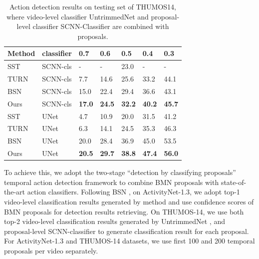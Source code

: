 \documentclass[10pt,twocolumn,letterpaper]{article}
\begin{document}
\begin{table}[tbp]
\centering
\caption{Action detection results on testing set of THUMOS14, where video-level classifier UntrimmedNet \cite{wang2017untrimmednets} and proposal-level classifier SCNN-Classifier \cite{shou2016action} are combined with proposals.}
\small
\begin{tabular}{p{1.4cm}p{1.4cm}p{0.52cm}<{\centering}p{0.52cm}<{\centering}p{0.52cm}<{\centering}p{0.52cm}<{\centering}p{0.52cm}<{\centering}}
\toprule
Method & classifier & 0.7 & 0.6 & 0.5 & 0.4 & 0.3  \\
\hline
SST \cite{sst_buch_cvpr17} & SCNN-cls 	& - & - & 23.0 & - &  -\\
TURN\cite{gao2017turn} & SCNN-cls 		& 7.7 & 14.6 & 25.6 & 33.2 &  44.1\\
BSN \cite{lin2018bsn} & SCNN-cls & 15.0 & 22.4 & 29.4 & 36.6 & 43.1 \\
Ours & SCNN-cls  & {\bf 17.0} & {\bf 24.5} & {\bf 32.2} & {\bf 40.2} & {\bf 45.7} \\
\hline
SST \cite{sst_buch_cvpr17} & UNet 		& 4.7 & 10.9 & 20.0 & 31.5 &  41.2\\
TURN\cite{gao2017turn} & UNet 			& 6.3 & 14.1 & 24.5 & 35.3 &  46.3\\
BSN \cite{lin2018bsn} & UNet & 20.0 & 28.4 & 36.9 & 45.0 & 53.5 \\
Ours & UNet & {\bf 20.5} & {\bf 29.7} & {\bf 38.8} & {\bf 47.4} & {\bf 56.0} \\ 
\bottomrule
\end{tabular}
\label{table_detection_thumos}
\normalsize
\vspace{-0.3cm}
\end{table}


To achieve this, we adopt the two-stage ``detection by classifying proposals'' temporal action detection framework to combine BMN proposals with state-of-the-art action classifiers.
%
Following BSN \cite{lin2018bsn}, on ActivityNet-1.3, we adopt top-1 video-level classification results generated by method \cite{zhao2017cuhk} and use confidence scores of BMN proposals for detection results retrieving. On THUMOS-14, we use both top-2 video-level classification results generated by UntrimmedNet \cite{wang2017untrimmednets}, and proposal-level SCNN-classifier to generate classification result for each proposal.
%
For ActivityNet-1.3 and THUMOS-14 datasets, we use first 100 and 200 temporal proposals per video separately. 
\end{document}
